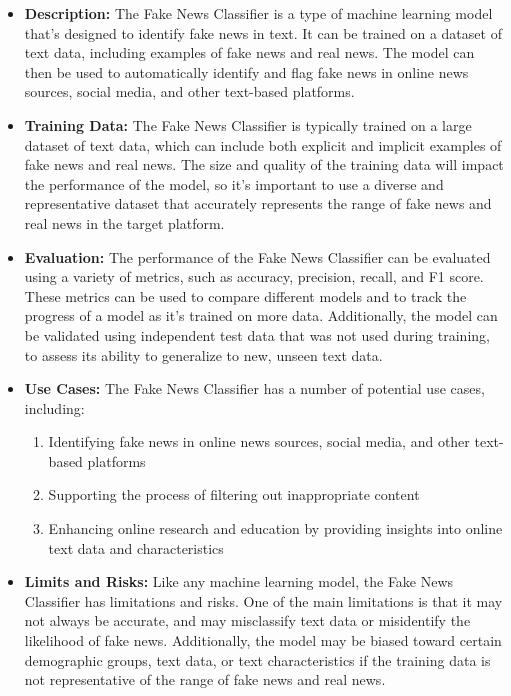 \begin{itemize}
    \item \textbf{Description:} The Fake News Classifier is a type of machine learning model that's designed to identify fake news in text. It can be trained on a dataset of text data, including examples of fake news and real news. The model can then be used to automatically identify and flag fake news in online news sources, social media, and other text-based platforms.
    \item \textbf{Training Data:} The Fake News Classifier is typically trained on a large dataset of text data, which can include both explicit and implicit examples of fake news and real news. The size and quality of the training data will impact the performance of the model, so it's important to use a diverse and representative dataset that accurately represents the range of fake news and real news in the target platform.
    \item \textbf{Evaluation:} The performance of the Fake News Classifier can be evaluated using a variety of metrics, such as accuracy, precision, recall, and F1 score. These metrics can be used to compare different models and to track the progress of a model as it's trained on more data. Additionally, the model can be validated using independent test data that was not used during training, to assess its ability to generalize to new, unseen text data.
    \item \textbf{Use Cases:} The Fake News Classifier has a number of potential use cases, including:
        \begin{enumerate}  
            \item Identifying fake news in online news sources, social media, and other text-based platforms
            \item Supporting the process of filtering out inappropriate content
            \item Enhancing online research and education by providing insights into online text data and characteristics
        \end{enumerate}
    \item \textbf{Limits and Risks:} Like any machine learning model, the Fake News Classifier has limitations and risks. One of the main limitations is that it may not always be accurate, and may misclassify text data or misidentify the likelihood of fake news. Additionally, the model may be biased toward certain demographic groups, text data, or text characteristics if the training data is not representative of the range of fake news and real news.

\end{itemize}
